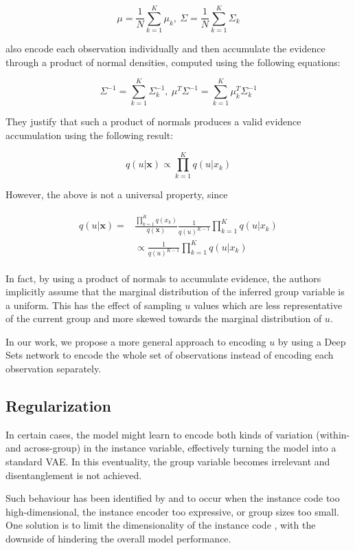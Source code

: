 \documentclass[nohyperref]{article}
\theoremstyle{plain}
\theoremstyle{definition}
\theoremstyle{remark}
\begin{document}
$$\mu = \frac{1}{N} \sum_{k=1}^K \mu_k, ~ \Sigma = \frac{1}{N} \sum_{k=1}^K \Sigma_k$$

\citet{Bouchacourt2018MultiLevelVA} also encode each observation individually and then accumulate the evidence through a product of normal densities, computed using the following equations:

$$\Sigma^{-1} = \sum_{k=1}^K \Sigma_k^{-1}, ~ \mu^T \Sigma^{-1} = \sum_{k=1}^K \mu_k^T \Sigma_k^{-1}$$

They justify that such a product of normals produces a valid evidence accumulation using the following result:

$$q(u | \mathbf{x}) \propto \prod_{k=1}^K q(u | x_k)$$

However, the above is not a universal property, since

\begin{align}
    \begin{split}
        q(u | \mathbf{x}) = &\frac{\prod_{k=1}^K q(x_k)}{q(\mathbf{x})} \frac{1}{q(u)^{K-1}} \prod_{k=1}^K q(u | x_k) \\ &\propto \frac{1}{q(u)^{K-1}} \prod_{k=1}^K q(u | x_k)
    \end{split}
\end{align}

In fact, by using a product of normals to accumulate evidence, the authors implicitly assume that the marginal distribution of the inferred group variable is a uniform. This has the effect of sampling $u$ values which are less representative of the current group and more skewed towards the marginal distribution of $u$.

In our work, we propose a more general approach to encoding $u$ by using a Deep Sets  network \citep{Zaheer2017DeepS} to encode the whole set of observations instead of encoding each observation separately.

\subsection{Regularization}

In certain cases, the model might learn to encode both kinds of variation (within- and across-group) in the instance variable, effectively turning the model into a standard VAE. In this eventuality, the group variable becomes irrelevant and disentanglement is not achieved.

Such behaviour has been identified by \citet{Hosoya2019GroupbasedLO} and \citet{Nmeth2020AdversarialDW} to occur when the instance code too high-dimensional, the instance encoder too expressive, or group sizes too small. One solution is to limit the dimensionality of the instance code \citep{Hosoya2019GroupbasedLO}, with the downside of hindering the overall model performance. 
\end{document}
